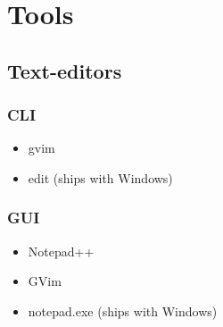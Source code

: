 
\chapter{Tools}\label{tools}
\section{Text-editors}\label{text-editors}
\subsection{CLI}
\begin{itemize}
\item gvim
\item edit (ships with Windows)  
\end{itemize}

\subsection{GUI}
\begin{itemize}
\item Notepad++
\item GVim
\item notepad.exe (ships with Windows)
\end{itemize}  
